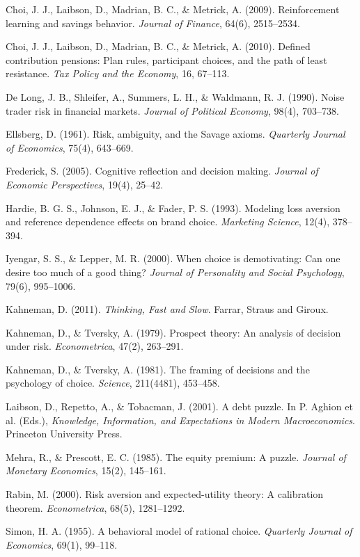 \documentclass[12pt, letterpaper]{article}
\begin{document}
Choi, J. J., Laibson, D., Madrian, B. C., \& Metrick, A. (2009). Reinforcement learning and savings behavior. \textit{Journal of Finance}, 64(6), 2515--2534.

Choi, J. J., Laibson, D., Madrian, B. C., \& Metrick, A. (2010). Defined contribution pensions: Plan rules, participant choices, and the path of least resistance. \textit{Tax Policy and the Economy}, 16, 67--113.

De Long, J. B., Shleifer, A., Summers, L. H., \& Waldmann, R. J. (1990). Noise trader risk in financial markets. \textit{Journal of Political Economy}, 98(4), 703--738.

Ellsberg, D. (1961). Risk, ambiguity, and the Savage axioms. \textit{Quarterly Journal of Economics}, 75(4), 643--669.

Frederick, S. (2005). Cognitive reflection and decision making. \textit{Journal of Economic Perspectives}, 19(4), 25--42.

Hardie, B. G. S., Johnson, E. J., \& Fader, P. S. (1993). Modeling loss aversion and reference dependence effects on brand choice. \textit{Marketing Science}, 12(4), 378--394.

Iyengar, S. S., \& Lepper, M. R. (2000). When choice is demotivating: Can one desire too much of a good thing? \textit{Journal of Personality and Social Psychology}, 79(6), 995--1006.

Kahneman, D. (2011). \textit{Thinking, Fast and Slow}. Farrar, Straus and Giroux.

Kahneman, D., \& Tversky, A. (1979). Prospect theory: An analysis of decision under risk. \textit{Econometrica}, 47(2), 263--291.

Kahneman, D., \& Tversky, A. (1981). The framing of decisions and the psychology of choice. \textit{Science}, 211(4481), 453--458.

Laibson, D., Repetto, A., \& Tobacman, J. (2001). A debt puzzle. In P. Aghion et al. (Eds.), \textit{Knowledge, Information, and Expectations in Modern Macroeconomics}. Princeton University Press.

Mehra, R., \& Prescott, E. C. (1985). The equity premium: A puzzle. \textit{Journal of Monetary Economics}, 15(2), 145--161.

Rabin, M. (2000). Risk aversion and expected-utility theory: A calibration theorem. \textit{Econometrica}, 68(5), 1281--1292.

Simon, H. A. (1955). A behavioral model of rational choice. \textit{Quarterly Journal of Economics}, 69(1), 99--118.
\end{document}
